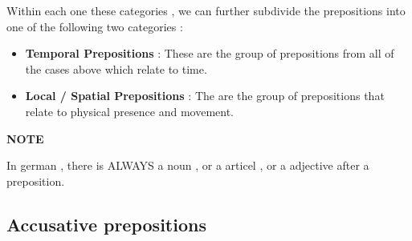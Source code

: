 \documentclass[a4paper,twocolumn,10pt]{article}
\newcommand{\newpar}
{\par \vspace{0.3cm}}
\newcommand{\tcolorboxstart}
{
	\nolinenumbers
	\vspace{0.2cm}
	\centering
}
\newcommand{\tcolorboxend}
{
	\justifying
	\vspace{0.2cm}
	\linenumbers
}
\newcommand{\tcolorboxnote}[1]
{

\tcolorboxstart
\begin{note-bg}

	\begin{note-theword}
		{\footnotesize \textbf{NOTE} }
	\end{note-theword}

	\begin{note-content} \justifying

		#1

	\end{note-content}

\end{note-bg}
\tcolorboxend
}
\begin{document}

Within each one these categories , we can further subdivide the prepositions
into one of the following two categories :\newpar



\begin{itemize}[noitemsep]

	\item \textbf{Temporal Prepositions} : These are the group of prepositions from all
		of the cases above which relate to time.

	\item \textbf{Local / Spatial Prepositions} : The are the group of prepositions that
		relate to physical presence and movement.

\end{itemize}



\tcolorboxnote
{
In german , there is ALWAYS a noun , or a articel , or a adjective after a
preposition. 
}




\subsection{Accusative prepositions}
\label{ssec:accusative_prepositions}


\end{document}
